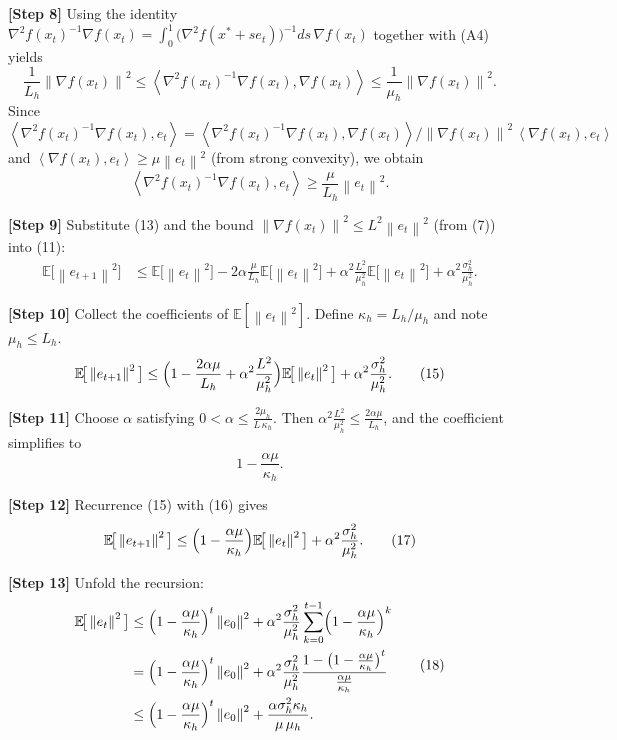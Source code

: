 \documentclass{article}
\newcommand{\E}{\mathbb{E}}
\newcommand{\norm}[1]{\left\|#1\right\|}
\newcommand{\ip}[2]{\left\langle #1,#2\right\rangle}
\begin{document}
\noindent\textbf{[Step 8]} Using the identity $\nabla^{2}f(x_{t})^{-1}\nabla f(x_{t}) = \int_{0}^{1}\!\!\big(\nabla^{2}f(x^{*}+s e_{t})\big)^{-1}\!ds\,\nabla f(x_{t})$ together with (A4) yields
\[
\frac{1}{L_{h}}\norm{\nabla f(x_{t})}^{2}
\le\ip{\nabla^{2}f(x_{t})^{-1}\nabla f(x_{t})}{\nabla f(x_{t})}
\le\frac{1}{\mu_{h}}\norm{\nabla f(x_{t})}^{2}.
\tag{12}
\]
Since $\ip{\nabla^{2}f(x_{t})^{-1}\nabla f(x_{t})}{e_{t}}
=\ip{\nabla^{2}f(x_{t})^{-1}\nabla f(x_{t})}{\nabla f(x_{t})}/\norm{\nabla f(x_{t})}^{2}\,\ip{\nabla f(x_{t})}{e_{t}}$ and $\ip{\nabla f(x_{t})}{e_{t}}\ge\mu\norm{e_{t}}^{2}$ (from strong convexity), we obtain
\[
\ip{\nabla^{2}f(x_{t})^{-1}\nabla f(x_{t})}{e_{t}}
\ge\frac{\mu}{L_{h}}\norm{e_{t}}^{2}.
\tag{13}
\]

\noindent\textbf{[Step 9]} Substitute (13) and the bound $\norm{\nabla f(x_{t})}^{2}\le L^{2}\norm{e_{t}}^{2}$ (from (7)) into (11):
\[
\begin{aligned}
\E\!\big[\norm{e_{t+1}}^{2}\big]
&\le \E\!\big[\norm{e_{t}}^{2}\big]
-2\alpha\frac{\mu}{L_{h}}\E\!\big[\norm{e_{t}}^{2}\big]
+\alpha^{2}\frac{L^{2}}{\mu_{h}^{2}}\E\!\big[\norm{e_{t}}^{2}\big]
+\alpha^{2}\frac{\sigma_{h}^{2}}{\mu_{h}^{2}}.
\end{aligned}
\tag{14}
\]

\noindent\textbf{[Step 10]} Collect the coefficients of $\E[\norm{e_{t}}^{2}]$.
Define $\kappa_{h}=L_{h}/\mu_{h}$ and note $\mu_{h}\le L_{h}$.
\[
\E\!\big[\norm{e_{t+1}}^{2}\big]
\le\Bigl(1-\frac{2\alpha\mu}{L_{h}}+\alpha^{2}\frac{L^{2}}{\mu_{h}^{2}}\Bigr)
\E\!\big[\norm{e_{t}}^{2}\big]
+\alpha^{2}\frac{\sigma_{h}^{2}}{\mu_{h}^{2}}.
\tag{15}
\]

\noindent\textbf{[Step 11]} Choose $\alpha$ satisfying $0<\alpha\le\frac{2\mu_{h}}{L\,\kappa_{h}}$.
Then $\alpha^{2}\frac{L^{2}}{\mu_{h}^{2}}\le\frac{2\alpha\mu}{L_{h}}$, and the coefficient simplifies to
\[
1-\frac{\alpha\mu}{\kappa_{h}}.
\tag{16}
\]

\noindent\textbf{[Step 12]} Recurrence (15) with (16) gives
\[
\E\!\big[\norm{e_{t+1}}^{2}\big]
\le\Bigl(1-\frac{\alpha\mu}{\kappa_{h}}\Bigr)\E\!\big[\norm{e_{t}}^{2}\big]
+\alpha^{2}\frac{\sigma_{h}^{2}}{\mu_{h}^{2}}.
\tag{17}
\]

\noindent\textbf{[Step 13]} Unfold the recursion:
\[
\begin{aligned}
\E\!\big[\norm{e_{t}}^{2}\big]
&\le\Bigl(1-\frac{\alpha\mu}{\kappa_{h}}\Bigr)^{t}\norm{e_{0}}^{2}
+\alpha^{2}\frac{\sigma_{h}^{2}}{\mu_{h}^{2}}
\sum_{k=0}^{t-1}\Bigl(1-\frac{\alpha\mu}{\kappa_{h}}\Bigr)^{k}\\
&= \Bigl(1-\frac{\alpha\mu}{\kappa_{h}}\Bigr)^{t}\norm{e_{0}}^{2}
+\alpha^{2}\frac{\sigma_{h}^{2}}{\mu_{h}^{2}}
\frac{1-\bigl(1-\frac{\alpha\mu}{\kappa_{h}}\bigr)^{t}}{\frac{\alpha\mu}{\kappa_{h}}}\\
&\le \Bigl(1-\frac{\alpha\mu}{\kappa_{h}}\Bigr)^{t}\norm{e_{0}}^{2}
+\frac{\alpha\sigma_{h}^{2}\kappa_{h}}{\mu\,\mu_{h}}.
\end{aligned}
\tag{18}
\]
\end{document}
